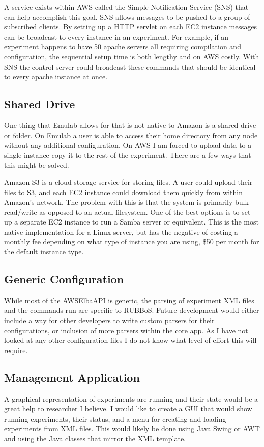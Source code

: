 \documentclass{article}
\begin{document}
A service exists within AWS called the Simple Notification Service (SNS) that can help accomplish this goal. SNS allows messages to be pushed to a group of subscribed clients. By setting up a HTTP servlet on each EC2 instance messages can be broadcast to every instance in an experiment. For example, if an experiment happens to have 50 apache servers all requiring compilation and configuration, the sequential setup time is both lengthy and on AWS costly. With SNS the control server could broadcast these commands that should be identical to every apache instance at once.
\subsection{Shared Drive}
One thing that Emulab allows for that is not native to Amazon is a shared drive or folder. On Emulab a user is able to access their home directory from any node without any additional configuration. On AWS I am forced to upload data to a single instance copy it to the rest of the experiment. There are a few ways that this might be solved.

Amazon S3 is a cloud storage service for storing files. A user could upload their files to S3, and each EC2 instance could download them quickly from within Amazon's network. The problem with this is that the system is primarily bulk read/write as opposed to an actual filesystem. One of the best options is to set up a separate EC2 instance to run a Samba server or equivalent. This is the most native implementation for a Linux server, but has the negative of costing a monthly fee depending on what type of instance you are using, \$50 per month for the default instance type.
\subsection{Generic Configuration}
While most of the AWSElbaAPI is generic, the parsing of experiment XML files and the commands run are specific to RUBBoS. Future development would either include a way for other developers to write custom parsers for their configurations, or inclusion of more parsers within the core app. As I have not looked at any other configuration files I do not know what level of effort this will require.
\subsection{Management Application}
A graphical representation of experiments are running and their state would be a great help to researcher I believe. I would like to create a GUI that would show running experiments, their status, and a menu for creating and loading experiments from XML files. This would likely be done using Java Swing or AWT and using the Java classes that mirror the XML template.
\end{document}
